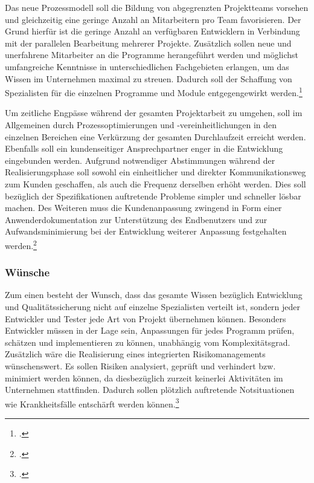 Das neue Prozessmodell soll die Bildung von abgegrenzten Projektteams vorsehen und gleichzeitig eine geringe Anzahl an Mitarbeitern pro Team favorisieren. Der Grund hierfür ist die geringe Anzahl an verfügbaren Entwicklern in Verbindung mit der parallelen Bearbeitung mehrerer Projekte. Zusätzlich sollen neue und unerfahrene Mitarbeiter an die Programme herangeführt werden und möglichst umfangreiche Kenntnisse in unterschiedlichen Fachgebieten erlangen, um das Wissen im Unternehmen maximal zu streuen. Dadurch soll der Schaffung von Spezialisten für die einzelnen Programme und Module entgegengewirkt werden.\footcite[Vgl.][]{interview}

Um zeitliche Engpässe während der gesamten Projektarbeit zu umgehen, soll im Allgemeinen durch Prozessoptimierungen und -vereinheitlichungen in den einzelnen Bereichen eine Verkürzung der gesamten Durchlaufzeit erreicht werden. Ebenfalls soll ein kundenseitiger Ansprechpartner enger in die Entwicklung eingebunden werden. Aufgrund notwendiger Abstimmungen während der Realisierungsphase soll sowohl ein einheitlicher und direkter Kommunikationsweg zum Kunden geschaffen, als auch die Frequenz derselben erhöht werden. Dies soll bezüglich der Spezifikationen auftretende Probleme simpler und schneller lösbar machen. Des Weiteren muss die Kundenanpassung zwingend in Form einer Anwenderdokumentation zur Unterstützung des Endbenutzers und zur Aufwandsminimierung bei der Entwicklung weiterer Anpassung festgehalten werden.\footcite[Vgl.][]{interview}

\subsubsection{Wünsche}
Zum einen besteht der Wunsch, dass das gesamte Wissen bezüglich Entwicklung und Qualitätssicherung nicht auf einzelne Spezialisten verteilt ist, sondern jeder Entwickler und Tester jede Art von Projekt übernehmen können. Besonders Entwickler müssen in der Lage sein, Anpassungen für jedes Programm prüfen, schätzen und implementieren zu können, unabhängig vom Komplexitätsgrad. Zusätzlich wäre die Realisierung eines integrierten Risikomanagements wünschenswert. Es sollen Risiken analysiert, geprüft und verhindert bzw. minimiert werden können, da diesbezüglich zurzeit keinerlei Aktivitäten im Unternehmen stattfinden. Dadurch sollen plötzlich auftretende Notsituationen wie Krankheitsfälle entschärft werden können.\footcite[Vgl.][]{interview}